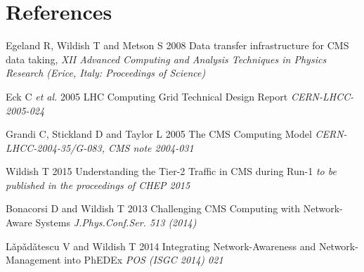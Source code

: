 \section*{References}

\begin{thebibliography}{1}

  Egeland R, Wildish T and Metson S 2008 Data transfer infrastructure for CMS data taking,  {\it XII Advanced Computing and Analysis Techniques in Physics Research (Erice, Italy: Proceedings of Science)}

 Eck C {\it et al.} 2005 LHC Computing Grid Technical Design Report {\it CERN-LHCC-2005-024}

  Grandi C, Stickland D and Taylor L 2005 The CMS Computing Model {\it CERN-LHCC-2004-35/G-083, CMS note 2004-031}

 Wildish T 2015 Understanding the Tier-2 Traffic in CMS during Run-1 {\it to be published in the proceedings of CHEP 2015}

 Bonacorsi D and Wildish T 2013 Challenging CMS Computing with Network-Aware Systems {\it J.Phys.Conf.Ser. 513 (2014)}

 L\v{a}p\v{a}d\v{a}tescu V and Wildish T 2014 Integrating Network-Awareness and Network-Management into PhEDEx {\it POS (ISGC 2014) 021}

\end{thebibliography}
